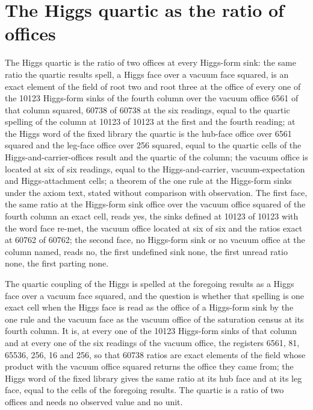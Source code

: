 \section{The Higgs quartic as the ratio of offices}\label{mod:VI-10-D540200-hqrt-t1}
\begin{chtheorem}\label{box:VI-10-D540200-hqrt-t1:1}
The Higgs quartic is the ratio of two offices at every Higgs-form sink: the same ratio the quartic results spell, a Higgs face over a vacuum face squared, is an exact element of the field of root two and root three at the office of every one of the 10123 Higgs-form sinks of the fourth column over the vacuum office 6561 of that column squared, 60738 of 60738 at the six readings, equal to the quartic spelling of the column at 10123 of 10123 at the first and the fourth reading; at the Higgs word of the fixed library the quartic is the hub-face office over 6561 squared and the leg-face office over 256 squared, equal to the quartic cells of the Higgs-and-carrier-offices result and the quartic of the column; the vacuum office is located at six of six readings, equal to the Higgs-and-carrier, vacuum-expectation and Higgs-attachment cells; a theorem of the one rule at the Higgs-form sinks under the axiom text, stated without comparison with observation.
The first face, the same ratio at the Higgs-form sink office over the vacuum office squared of the fourth column an exact cell, reads yes, the sinks defined at 10123 of 10123 with the word face re-met, the vacuum office located at six of six and the ratios exact at 60762 of 60762; the second face, no Higgs-form sink or no vacuum office at the column named, reads no, the first undefined sink none, the first unread ratio none, the first parting none.
\end{chtheorem}
The quartic coupling of the Higgs is spelled at the foregoing results as a Higgs face over a vacuum face squared, and the question is whether that spelling is one exact cell when the Higgs face is read as the office of a Higgs-form sink by the one rule and the vacuum face as the vacuum office of the saturation census at its fourth column. It is, at every one of the 10123 Higgs-form sinks of that column and at every one of the six readings of the vacuum office, the registers 6561, 81, 65536, 256, 16 and 256, so that 60738 ratios are exact elements of the field whose product with the vacuum office squared returns the office they came from; the Higgs word of the fixed library gives the same ratio at its hub face and at its leg face, equal to the cells of the foregoing results. The quartic is a ratio of two offices and needs no observed value and no unit.

